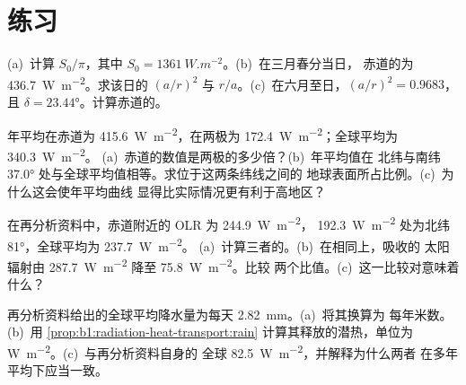 \section{练习}

\begin{exercise}[$\star$]\label{exo:b1:radiation-heat-transport:1}
(a)~计算 $S_0/\pi$，其中 $S_0 = \qty{1361}{W.m^{-2}}$。(b)~在三月春分当日，
赤道的为 \qty{436.7}{W.m^{-2}}。求该日的
$(a/r)^2$ 与 $r/a$。(c)~在六月至日，$(a/r)^2 = 0.9683$，且
$\delta = \ang{23.44}$。计算赤道的。
\end{exercise}

\begin{exercise}[$\star$]\label{exo:b1:radiation-heat-transport:2}
年平均在赤道为 \qty{415.6}{W.m^{-2}}，在两极为
\qty{172.4}{W.m^{-2}}；全球平均为 \qty{340.3}{W.m^{-2}}。
(a)~赤道的数值是两极的多少倍？(b)~年平均值在
北纬与南纬 \ang{37.0} 处与全球平均值相等。求位于这两条纬线之间的
地球表面所占比例。(c)~为什么这会使年平均曲线
显得比实际情况更有利于高地区？
\end{exercise}

\begin{exercise}[$\star$]\label{exo:b1:radiation-heat-transport:3}
在再分析资料中，赤道附近的 OLR 为 \qty{244.9}{W.m^{-2}}，
\qty{192.3}{W.m^{-2}} 处为北纬 \ang{81}，全球平均为 \qty{237.7}{W.m^{-2}}。
(a)~计算三者的。(b)~在相同上，吸收的
太阳辐射由 \qty{287.7}{W.m^{-2}} 降至 \qty{75.8}{W.m^{-2}}。比较
两个比值。(c)~这一比较对意味着什么？
\end{exercise}

\begin{exercise}[$\star$]\label{exo:b1:radiation-heat-transport:4}
再分析资料给出的全球平均降水量为每天 \qty{2.82}{mm}。(a)~将其换算为
每年米数。(b)~用
\cref{prop:b1:radiation-heat-transport:rain} 计算其释放的潜热，单位为 \unit{W.m^{-2}}。(c)~与再分析资料自身的
全球 \qty{82.5}{W.m^{-2}}，并解释为什么两者
在多年平均下应当一致。
\end{exercise}


